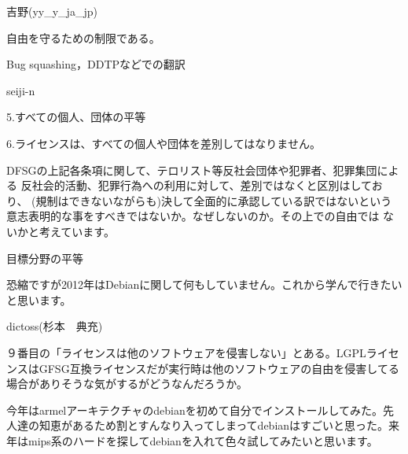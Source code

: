 
\begin{prework}{ 吉野(yy\_y\_ja\_jp) }


 自由を守るための制限である。


 Bug squashing，DDTPなどでの翻訳
\end{prework}

\begin{prework}{ seiji-n }

5.すべての個人、団体の平等

6.ライセンスは、すべての個人や団体を差別してはなりません。

DFSGの上記各条項に関して、テロリスト等反社会団体や犯罪者、犯罪集団による
反社会的活動、犯罪行為への利用に対して、差別ではなくと区別はしており、
(規制はできないながらも)決して全面的に承認している訳ではないという
意志表明的な事をすべきではないか。なぜしないのか。その上での自由では
ないかと考えています。


目標分野の平等


恐縮ですが2012年はDebianに関して何もしていません。これから学んで行きたいと思います。

\end{prework}

\begin{prework}{ dictoss(杉本　典充) }


９番目の「ライセンスは他のソフトウェアを侵害しない」とある。LGPLライセンスはGFSG互換ライセンスだが実行時は他のソフトウェアの自由を侵害してる場合がありそうな気がするがどうなんだろうか。



今年はarmelアーキテクチャのdebianを初めて自分でインストールしてみた。先人達の知恵があるため割とすんなり入ってしまってdebianはすごいと思った。来年はmips系のハードを探してdebianを入れて色々試してみたいと思います。
\end{prework}


